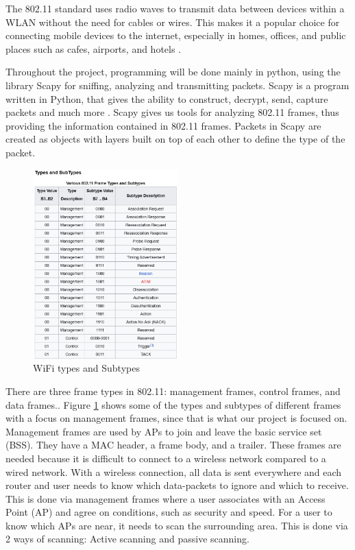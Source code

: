 The 802.11 standard uses radio waves to transmit data between devices within a WLAN without the need for cables or wires. This makes it a popular choice for connecting mobile devices to the internet, especially in homes, offices, and public places such as cafes, airports, and hotels \cite{Public_WiFi}.

Throughout the project, programming will be done mainly in python, using the library Scapy for sniffing, analyzing and transmitting packets. Scapy is a program written in Python, that gives the ability to construct, decrypt, send, capture packets and much more \cite{IEEE_Scapy}. 
Scapy gives us tools for analyzing 802.11 frames, thus providing the information contained in 802.11 frames. Packets in Scapy are created as objects with layers built on top of each other to define the type of the packet. 
\\

\begin{figure}[!htbp]
    \centering
    \includegraphics[width=0.5\textwidth]{Latex-Files/Billeder/WiFi_Types.png}
    \caption{WiFi types and Subtypes}
    \label{WiFi Types}
\end{figure}

There are three frame types in 802.11: management frames, control frames, and data frames.\cite{Amit802.11frames, DefinitiveGast}. Figure \ref{WiFi Types} shows some of the types and subtypes of different frames with a focus on management frames, since that is what our project is focused on.  Management frames are used by APs to join and leave the basic service set (BSS). They have a MAC header, a frame body, and a trailer. These frames are needed because it is difficult to connect to a wireless network compared to a wired network. With a wireless connection, all data is sent everywhere and each router and user needs to know which data-packets to ignore and which to receive. This is done via management frames where a user associates with an Access Point (AP) and agree on conditions, such as security and speed. For a user to know which APs are near, it needs to scan the surrounding area. This is done via 2 ways of scanning: Active scanning and passive scanning.

